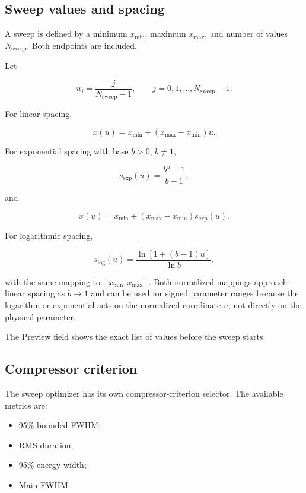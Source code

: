 \documentclass[11pt,a4paper]{article}
\begin{document}
\subsection{Sweep values and spacing}

A sweep is defined by a minimum $x_{\min}$, maximum $x_{\max}$, and number of
values $N_{\mathrm{sweep}}$. Both endpoints are included.

Let

\begin{equation}
u_j=\frac{j}{N_{\mathrm{sweep}}-1},
\qquad
j=0,1,\ldots,N_{\mathrm{sweep}}-1.
\end{equation}

For linear spacing,

\begin{equation}
x(u)=x_{\min}+(x_{\max}-x_{\min})u.
\end{equation}

For exponential spacing with base $b>0$, $b\ne1$,

\begin{equation}
\boxed{
s_{\exp}(u)=\frac{b^u-1}{b-1},
}
\end{equation}

and

\begin{equation}
x(u)=x_{\min}+(x_{\max}-x_{\min})s_{\exp}(u).
\end{equation}

For logarithmic spacing,

\begin{equation}
\boxed{
s_{\log}(u)
=
\frac{\ln[1+(b-1)u]}{\ln b},
}
\end{equation}

with the same mapping to $[x_{\min},x_{\max}]$. Both normalized mappings
approach linear spacing as $b\rightarrow1$ and can be used for signed parameter
ranges because the logarithm or exponential acts on the normalized coordinate
$u$, not directly on the physical parameter.

The Preview field shows the exact list of values before the sweep starts.

\subsection{Compressor criterion}

The sweep optimizer has its own compressor-criterion selector. The available
metrics are:

\begin{itemize}
    \item 95\%-bounded FWHM;
    \item RMS duration;
    \item 95\% energy width;
    \item Main FWHM.
\end{itemize}
\end{document}
